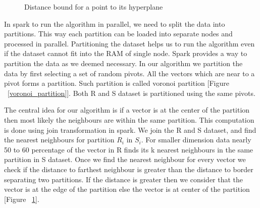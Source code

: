\begin{center}
\begin{figure}
\caption{ Distance bound for a point to its hyperplane }
\label{fig_triangle_inequality}
\end{figure}
\end{center}


In spark to run the algorithm in parallel, we need to split the data
into partitions. This way each partition can be loaded into separate
nodes and processed in parallel. Partitioning the dataset helps us to run
the algorithm even if the dataset cannot fit into the RAM of single
node. Spark provides a way to partition the data as we deemed necessary.
In our algorithm we partition the data by first selecting a set of
random pivots. All the vectors which are near to a pivot forms a
partition. Such partition is called voronoi partition [Figure ~\ref{voronoi_partition}]. Both R and S
dataset is partitioned using the same pivots.

The central
idea for our algorithm is if a vector is at the center of the partition
then most likely the neighbours are within the same partition. This
computation is done using join transformation in spark. We join
the R and S dataset, and find the nearest neighbours for partition
$R_i$ in $S_i$. For smaller dimension data nearly 50 to 60 percentage
of the vector in R finds its k nearest neighbours in the same
partition in S dataset. Once we find the nearest neighbour for every
vector we check if the distance to farthest neighbour is greater than
the distance to border separating two partitions. If the distance is
greater then we consider that the vector is at the edge of the
partition else the vector is at center of the partition [Figure ~\ref{fig_triangle_inequality}].

